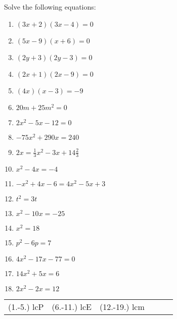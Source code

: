 \begin{exercises}{ }
{
Solve the following equations:
\begin{multicols}{2}
\begin{enumerate}[itemsep=5pt, label=\textbf{\arabic*}. ] 
\item  $(3x+2)(3x-4)=0$
\item  $(5x-9)(x+6)=0$
\item  $(2y+3)(2y-3)=0$ 
\item  $(2x+1)(2x-9)=0$    
\item  $(4x)(x-3)=-9$       
\item  $20m+25{m}^{2}=0$
\item  $2{x}^{2}-5x-12=0$  
\item  $-75{x}^{2}+290x=240$
\item  $2x=\frac{1}{3}{x}^{2}-3x+14\frac{2}{3}$
\item  ${x}^{2}-4x=-4$      
\item  $-{x}^{2}+4x-6=4{x}^{2}-5x+3$       
\item  ${t}^{2}=3t$  
\item  ${x}^{2}-10x=-25$      
\item  ${x}^{2}=18$
\item  ${p}^{2}-6p=7$
\item  $4{x}^{2}-17x-77=0$
\item  $14{x}^{2}+5x=6$
\item  $2{x}^{2}-2x=12$              
\end{enumerate}
\end{multicols}
\practiceinfo
\par 
\par\begin{tabular}[h]{cccccc}
(1.-5.) lcP  &  (6.-11.) lcE  &  (12.-19.) lcm \end{tabular}
}
\end{exercises}
